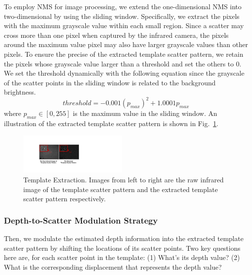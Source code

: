 To employ NMS for image processing, we extend the one-dimensional NMS into two-dimensional by using the sliding window. Specifically, we extract the pixels with the maximum grayscale value within each small region.
Since a scatter may cross more than one pixel when captured by the infrared camera, the pixels around the maximum value pixel may also have  larger grayscale values than other pixels. 
To ensure the precise of the extracted template scatter pattern, we retain the pixels whose grayscale value larger than a threshold and set the others to 0. We set the threshold dynamically with the following equation since the grayscale of the scatter points in the sliding window is related to the background brightness.
\begin{equation}
	threshold = -0.001(p_{max})^2 + 1.0001 p_{max}\label{nms_2}
\end{equation}
where $p_{max} \in \left [ 0, 255 \right ]$ is the maximum value in the sliding window. An illustration of the extracted template scatter pattern is shown in Fig.~\ref{template_extraction}.


\begin{figure}[!t]
	\centering
	\includegraphics[width=0.48\textwidth]{figures/template_extraction.pdf} 
	\vspace{-0.15in}
	\caption{Template Extraction. Images from left to right are the raw infrared image of the template scatter pattern and the extracted template scatter pattern respectively.}
	\label{template_extraction}
	\vspace{-0.15in}
\end{figure}


\subsubsection{Depth-to-Scatter Modulation Strategy}
Then, we modulate the estimated depth information into the extracted template scatter pattern by shifting the locations of its scatter points. 
Two key questions here are, for each scatter point in the template: (1) What's its depth value? (2) What is  the corresponding displacement that represents the depth value?

